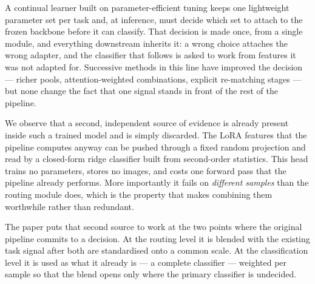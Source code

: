 \documentclass[runningheads]{llncs}
\begin{document}
A continual learner built on parameter-efficient tuning keeps one lightweight
parameter set per task and, at inference, must decide which set to attach to the
frozen backbone before it can classify. That decision is made once, from a
single module, and everything downstream inherits it: a wrong choice attaches
the wrong adapter, and the classifier that follows is asked to work from
features it was not adapted for. Successive methods in this line have improved
the decision --- richer pools, attention-weighted combinations, explicit
re-matching stages --- but none change the fact that one signal stands in front
of the rest of the pipeline.

We observe that a second, independent source of evidence is already present
inside such a trained model and is simply discarded. The LoRA features that the
pipeline computes anyway can be pushed through a fixed random projection and
read by a closed-form ridge classifier built from second-order statistics. This
head trains no parameters, stores no images, and costs one forward pass that the
pipeline already performs. More importantly it fails on \emph{different samples}
than the routing module does, which is the property that makes combining them
worthwhile rather than redundant.

The paper puts that second source to work at the two points where the original
pipeline commits to a decision. At the routing level it is blended with the
existing task signal after both are standardised onto a common scale. At the
classification level it is used as what it already is --- a complete classifier
--- weighted per sample so that the blend opens only where the primary
classifier is undecided.
\end{document}
